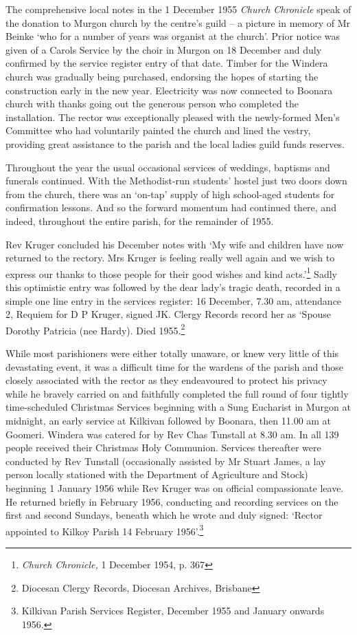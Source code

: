The comprehensive local notes in the 1 December 1955 \emph{Church Chronicle} speak of the donation to Murgon church by the centre's guild -- a picture in memory of Mr Beinke `who for a number of years was organist at the church'. Prior notice was given of a Carols Service by the choir in Murgon on 18 December and duly confirmed by the service register entry of that date. Timber for the Windera church was gradually being purchased, endorsing the hopes of starting the construction early in the new year. Electricity was now connected to Boonara church with thanks going out the generous person who completed the installation. The rector was exceptionally pleased with the newly-formed Men's Committee who had voluntarily painted the church and lined the vestry, providing great assistance to the parish and the local ladies guild funds reserves.

Throughout the year the usual occasional services of weddings, baptisms and funerals continued. With the Methodist-run students' hostel just two doors down from the church, there was an `on-tap' supply of high school-aged students for confirmation lessons. And so the forward momentum had continued there, and indeed, throughout the entire parish, for the remainder of 1955.

Rev Kruger concluded his December notes with `My wife and children have now returned to the rectory. Mrs Kruger is feeling really well again and we wish to express our thanks to those people for their good wishes and kind acts.'\footnote{\emph{Church Chronicle,} 1 December 1954, p. 367} Sadly this optimistic entry was followed by the dear lady's tragic death, recorded in a simple one line entry in the services register: 16 December, 7.30 am, attendance 2, Requiem for D P Kruger, signed JK. Clergy Records record her as `Spouse Dorothy Patricia (nee Hardy). Died 1955.\footnote{Diocesan Clergy Records, Diocesan Archives, Brisbane}

While most parishioners were either totally unaware, or knew very little of this devastating event, it was a difficult time for the wardens of the parish and those closely associated with the rector as they endeavoured to protect his privacy while he bravely carried on and faithfully completed the full round of four tightly time-scheduled Christmas Services beginning with a Sung Eucharist in Murgon at midnight, an early service at Kilkivan followed by Boonara, then 11.00 am at Goomeri. Windera was catered for by Rev Chas Tunstall at 8.30 am. In all 139 people received their Christmas Holy Communion. Services thereafter were conducted by Rev Tunstall (occasionally assisted by Mr Stuart James, a lay person locally stationed with the Department of Agriculture and Stock) beginning 1 January 1956 while Rev Kruger was on official compassionate leave. He returned briefly in February 1956, conducting and recording services on the first and second Sundays, beneath which he wrote and duly signed: `Rector appointed to Kilkoy Parish 14 February 1956'.\footnote{Kilkivan Parish Services Register, December 1955 and January onwards 1956.}

